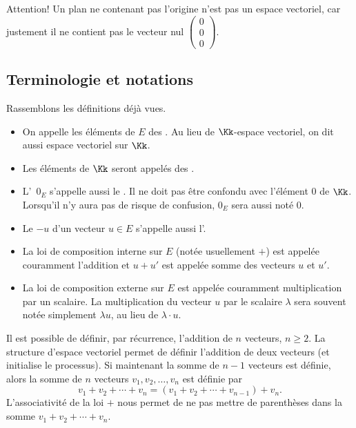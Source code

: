 \documentclass[class=report,crop=false]{standalone}
\begin{document}
\begin{exemple}
\medskip

Attention! Un plan ne contenant pas l'origine n'est pas un espace vectoriel,
car justement il ne contient pas le vecteur nul
$\left(\begin{smallmatrix}0\\ 0\\ 0\end{smallmatrix}\right)$.

\end{exemple}


\subsection{Terminologie et notations}

Rassemblons les définitions déjà vues.

\begin{itemize}
  \item On appelle les éléments de $E$ des .
  Au lieu de $\Kk$-espace vectoriel, on dit aussi espace vectoriel sur $\Kk$.
  \item Les éléments de $\Kk$ seront appelés des .
  \item L'\, $0_E$ s'appelle aussi le .
  Il ne doit pas être confondu avec l'élément $0$ de $\Kk$. Lorsqu'il n'y aura pas de risque de confusion,
  $0_{E}$ sera aussi noté $0$.
  \item Le  $-u$ d'un vecteur $u \in E$ s'appelle aussi l'.
  \item La loi de composition interne sur $E$ (notée usuellement $+$) est appelée couramment
  l'addition et $u+u'$ est appelée somme des vecteurs $u$ et $u'$.
  \item La loi de composition externe sur
  $E$ est appelée couramment multiplication par un scalaire.
  La multiplication du vecteur $u$ par le scalaire $\lambda$ sera souvent notée simplement $\lambda u$,
  au lieu de $\lambda \cdot u$.
\end{itemize}


\bigskip

Il est possible de définir, par récurrence, l'addition de $n$ vecteurs, $n\geq 2$.
La structure d'espace vectoriel permet de définir l'addition de deux vecteurs (et initialise le processus).
Si maintenant la somme de $n-1$ vecteurs est définie, alors la somme de $n$ vecteurs
$ v_1,v_2, \ldots, v_n$ est définie par
$$v_1+v_2+\cdots+v_n=(v_1+v_2+\cdots+v_{n-1})+v_n.$$
L'associativité de la loi $+$ nous permet de ne pas mettre de
parenthèses dans la somme $v_1+v_2+ \cdots+ v_n$.
\end{document}
